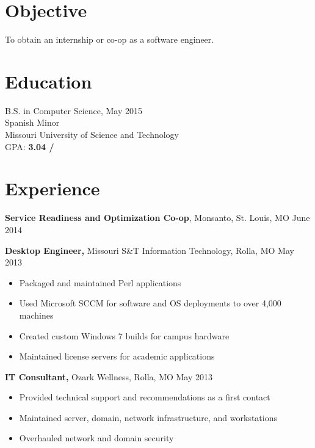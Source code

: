 \documentclass[margin]{res}
\begin{document}
 
 
   
  \address{{\bf Phone:}  \\ {\bf Email:} billy.rhoades@mst.edu}
  \address{123 Address Lane}
   
  \begin{resume} 
   
    \section{Objective} 
    To obtain an internship or co-op as a software engineer.

    \section{Education} 
      B.S. in Computer Science, May 2015 \\
      Spanish Minor \\
      Missouri University of Science and Technology \\
      GPA: {\bf 3.04 \slash {}}

    \section{Experience}
    {\bf Service Readiness and Optimization Co-op}, Monsanto, St. Louis, MO \hfill June 2014
       \begin{itemize} \itemsep -1pt  %
       \end{itemize}
     {\bf Desktop Engineer,} Missouri S\&T Information Technology, Rolla, MO \hfill May 2013
       \begin{itemize} \itemsep -1pt  %
         \item Packaged and maintained Perl applications
         \item Used Microsoft SCCM for software and OS deployments to over 4,000 machines
         \item Created custom Windows 7 builds for campus hardware
         \item Maintained license servers for academic applications
       \end{itemize}

     {\bf IT Consultant,} Ozark Wellness, Rolla, MO \hfill May 2013
       \begin{itemize} \itemsep -1pt  %
         \item Provided technical support and recommendations as a first contact
         \item Maintained server, domain, network infrastructure, and workstations
         \item Overhauled network and domain security
       \end{itemize}


\end{resume}
\end{document}
